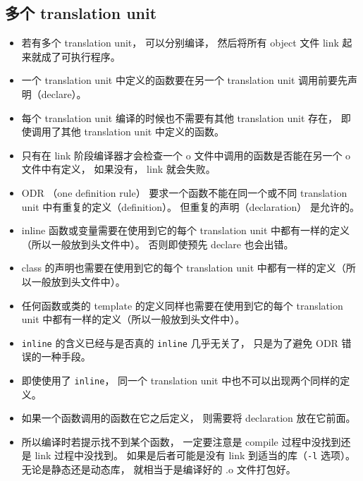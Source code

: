 \subsection{多个  translation unit}
\begin{itemize}
\item 若有多个 translation unit， 可以分别编译， 然后将所有 object 文件 link 起来就成了可执行程序。
\item 一个 translation unit 中定义的函数要在另一个 translation unit 调用前要先声明（declare）。
\item 每个 translation unit 编译的时候也不需要有其他 translation unit 存在， 即使调用了其他 translation unit 中定义的函数。
\item 只有在 link 阶段编译器才会检查一个 o 文件中调用的函数是否能在另一个 o 文件中有定义， 如果没有， link 就会失败。
\item ODR （one definition rule） 要求一个函数不能在同一个或不同 translation unit 中有重复的定义（definition）。 但重复的声明（declaration） 是允许的。
\item inline 函数或变量需要在使用到它的每个 translation unit 中都有一样的定义（所以一般放到头文件中）。 否则即使预先 declare 也会出错。
\item class 的声明也需要在使用到它的每个 translation unit 中都有一样的定义（所以一般放到头文件中）。
\item 任何函数或类的 template 的定义同样也需要在使用到它的每个 translation unit 中都有一样的定义（所以一般放到头文件中）。
\item \verb|inline| 的含义已经与是否真的 \verb|inline| 几乎无关了， 只是为了避免 ODR 错误的一种手段。
\item 即使使用了 \verb|inline|， 同一个 translation unit 中也不可以出现两个同样的定义。
\item 如果一个函数调用的函数在它之后定义， 则需要将 declaration 放在它前面。
\item 所以编译时若提示找不到某个函数， 一定要注意是 compile 过程中没找到还是 link 过程中没找到。 如果是后者可能是没有 link 到适当的库（\verb|-l| 选项）。 无论是静态还是动态库， 就相当于是编译好的 .o 文件打包好。
\end{itemize}
